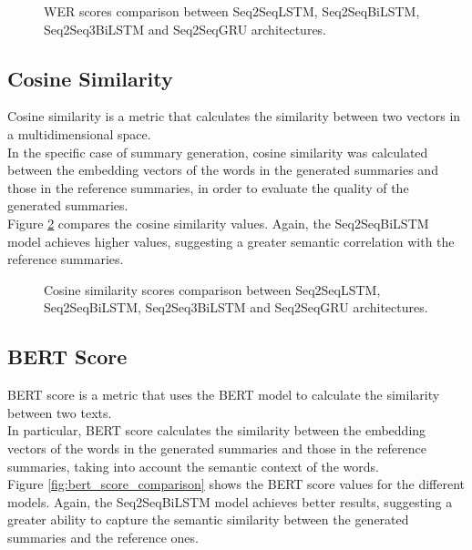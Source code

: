 \begin{figure}[H]
    \centering
    \hfill
    \hfill
    \hfill

    \caption{WER scores comparison between Seq2SeqLSTM, Seq2SeqBiLSTM, Seq2Seq3BiLSTM and Seq2SeqGRU architectures.}
    \label{fig:wer_comparison}
\end{figure}


\subsection{Cosine Similarity}
Cosine similarity is a metric that calculates the similarity between two vectors in a multidimensional space.\\
In the specific case of summary generation, cosine similarity was calculated between the embedding vectors of the words in the generated summaries and those in the reference summaries, in order to evaluate the quality of the generated summaries.\\
Figure \ref{fig:cosine_similarity_comparison} compares the cosine similarity values. Again, the Seq2SeqBiLSTM model achieves higher values, suggesting a greater semantic correlation with the reference summaries.

\begin{figure}[H]
    \centering
    \hfill
    \hfill
    \hfill

    \caption{Cosine similarity scores comparison between Seq2SeqLSTM, Seq2SeqBiLSTM, Seq2Seq3BiLSTM and Seq2SeqGRU architectures.}
    \label{fig:cosine_similarity_comparison}
\end{figure}

\subsection{BERT Score}
BERT score is a metric that uses the BERT model to calculate the similarity between two texts.\\
In particular, BERT score calculates the similarity between the embedding vectors of the words in the generated summaries and those in the reference summaries, taking into account the semantic context of the words.\\
Figure \ref{fig:bert_score_comparison} shows the BERT score values for the different models. Again, the Seq2SeqBiLSTM model achieves better results, suggesting a greater ability to capture the semantic similarity between the generated summaries and the reference ones.

